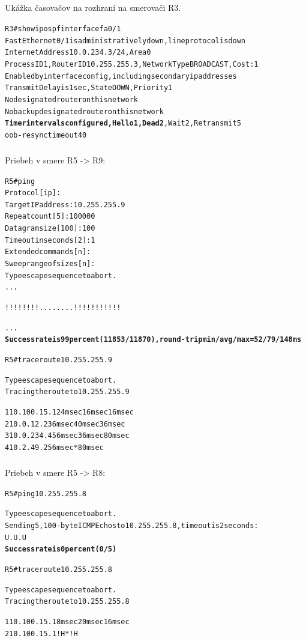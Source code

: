 \documentclass[12pt,twoside,a4paper]{article}
\begin{document}
\subparagraph{}
Ukážka časovačov na rozhraní  na smerovači R3.
\noindent
{\selectfont
\begin{small}
\begin{alltt}
R3#show ip ospf interface fa0/1
FastEthernet0/1 is administratively down, line protocol is down 
  Internet Address 10.0.234.3/24, Area 0 
  Process ID 1, Router ID 10.255.255.3, Network Type BROADCAST, Cost: 1
  Enabled by interface config, including secondary ip addresses
  Transmit Delay is 1 sec, State DOWN, Priority 1
  No designated router on this network
  No backup designated router on this network
  \textbf{Timer intervals configured, Hello 1, Dead 2}, Wait 2, Retransmit 5
    oob-resync timeout 40
\end{alltt}
\end{small}
}


\subparagraph{}
Priebeh  v smere R5 -\textgreater{} R9:

\noindent
{\selectfont
\begin{small}
\begin{alltt}

R5#ping
Protocol [ip]:
Target IP address: 10.255.255.9
Repeat count [5]: 100000
Datagram size [100]: 100
Timeout in seconds [2]: 1
Extended commands [n]:
Sweep range of sizes [n]:
Type escape sequence to abort.
...

!!!!!!!!........!!!!!!!!!!!

...
\textbf{Success rate is 99 percent (11853/11870), round-trip min/avg/max = 52/79/148 ms}




R5#traceroute 10.255.255.9

Type escape sequence to abort.
Tracing the route to 10.255.255.9

  1 10.100.15.1 24 msec 16 msec 16 msec
  2 10.0.12.2 36 msec 40 msec 36 msec
  3 10.0.234.4 56 msec 36 msec 80 msec
  4 10.2.49.2 56 msec *  80 msec

\end{alltt}
\end{small}
}



\subparagraph{}
Priebeh  v smere R5 -\textgreater{} R8:

\noindent
{\selectfont
\begin{small}
\begin{alltt}

R5#ping 10.255.255.8

Type escape sequence to abort.
Sending 5, 100-byte ICMP Echos to 10.255.255.8, timeout is 2 seconds:
U.U.U
\textbf{Success rate is 0 percent (0/5)}




R5#traceroute 10.255.255.8

Type escape sequence to abort.
Tracing the route to 10.255.255.8

  1 10.100.15.1 8 msec 20 msec 16 msec
  2 10.100.15.1 !H  *  !H

\end{alltt}
\end{small}
}
\end{document}
